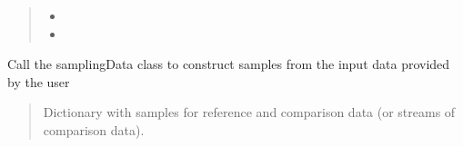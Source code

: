 \documentclass[letterpaper,10pt,english]{sphinxmanual}
\begin{document}
\begin{fulllineitems}
\begin{fulllineitems}
\end{fulllineitems}


\begin{fulllineitems}
\label{\detokenize{fldModules/embedding:embedding.embedding.final_embeddings}}
\pysigstartsignatures
{}
\pysigstopsignatures\begin{quote}\begin{description}
\sphinxAtStartPar
\begin{itemize}
\item {} 
\sphinxAtStartPar
{}

\item {} 
\sphinxAtStartPar
{}

\end{itemize}


\end{description}\end{quote}

\end{fulllineitems}


\begin{fulllineitems}
\label{\detokenize{fldModules/embedding:embedding.embedding.sampleData}}
\pysigstartsignatures
{}
\pysigstopsignatures
\sphinxAtStartPar
Call the samplingData class to construct samples from the input data provided by the user
\begin{quote}\begin{description}
\sphinxAtStartPar
Dictionary with samples for reference and comparison data (or streams of comparison data).

\end{description}\end{quote}

\end{fulllineitems}


\end{fulllineitems}
\end{document}
